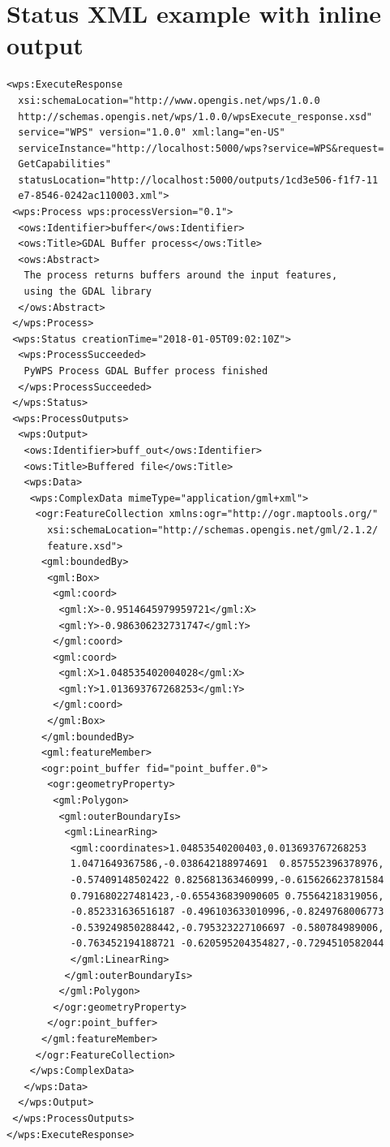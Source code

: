 \documentclass[12pt,a4paper]{article}
\begin{document}
\section{Status XML example with inline output}
\label{app:status_inline}
\begin{lstlisting}[basicstyle=\small,caption={Status XML example}]
<wps:ExecuteResponse
  xsi:schemaLocation="http://www.opengis.net/wps/1.0.0 
  http://schemas.opengis.net/wps/1.0.0/wpsExecute_response.xsd" 
  service="WPS" version="1.0.0" xml:lang="en-US" 
  serviceInstance="http://localhost:5000/wps?service=WPS&request=
  GetCapabilities" 
  statusLocation="http://localhost:5000/outputs/1cd3e506-f1f7-11
  e7-8546-0242ac110003.xml">
 <wps:Process wps:processVersion="0.1">
  <ows:Identifier>buffer</ows:Identifier>
  <ows:Title>GDAL Buffer process</ows:Title>
  <ows:Abstract>
   The process returns buffers around the input features,
   using the GDAL library
  </ows:Abstract>
 </wps:Process>
 <wps:Status creationTime="2018-01-05T09:02:10Z">
  <wps:ProcessSucceeded>
   PyWPS Process GDAL Buffer process finished
  </wps:ProcessSucceeded>
 </wps:Status>
 <wps:ProcessOutputs>
  <wps:Output>
   <ows:Identifier>buff_out</ows:Identifier>
   <ows:Title>Buffered file</ows:Title>
   <wps:Data>
    <wps:ComplexData mimeType="application/gml+xml">
     <ogr:FeatureCollection xmlns:ogr="http://ogr.maptools.org/" 
       xsi:schemaLocation="http://schemas.opengis.net/gml/2.1.2/
       feature.xsd">
      <gml:boundedBy>
       <gml:Box>
        <gml:coord>
         <gml:X>-0.9514645979959721</gml:X>
         <gml:Y>-0.986306232731747</gml:Y>
        </gml:coord>
        <gml:coord>
         <gml:X>1.048535402004028</gml:X>
         <gml:Y>1.013693767268253</gml:Y>
        </gml:coord>
       </gml:Box>
      </gml:boundedBy>
      <gml:featureMember>
      <ogr:point_buffer fid="point_buffer.0">
       <ogr:geometryProperty>
        <gml:Polygon>
         <gml:outerBoundaryIs>
          <gml:LinearRing>
           <gml:coordinates>1.04853540200403,0.013693767268253 
           1.0471649367586,-0.038642188974691  0.857552396378976,
           -0.57409148502422 0.825681363460999,-0.615626623781584 
           0.791680227481423,-0.655436839090605 0.75564218319056,
           -0.852331636516187 -0.496103633010996,-0.8249768006773
           -0.539249850288442,-0.795323227106697 -0.580784989006,
           -0.763452194188721 -0.620595204354827,-0.7294510582044
           </gml:LinearRing>
          </gml:outerBoundaryIs>
         </gml:Polygon>
        </ogr:geometryProperty>
       </ogr:point_buffer>
      </gml:featureMember>
     </ogr:FeatureCollection>
    </wps:ComplexData>
   </wps:Data>
  </wps:Output>
 </wps:ProcessOutputs>
</wps:ExecuteResponse>
\end{lstlisting}
\end{document}
